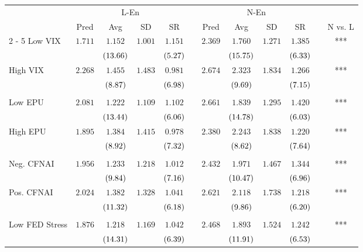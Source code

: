 \begin{tabular}{@{}lccccccccccc@{}}%
\toprule%
&\multicolumn{4}{c}{L{-}En}&&\multicolumn{4}{c}{N{-}En}&&\\%
\multicolumn{1}{c}{}&\multicolumn{1}{c}{Pred}&\multicolumn{1}{c}{Avg}&\multicolumn{1}{c}{SD}&\multicolumn{1}{c}{SR}&\multicolumn{1}{c}{}&\multicolumn{1}{c}{Pred}&\multicolumn{1}{c}{Avg}&\multicolumn{1}{c}{SD}&\multicolumn{1}{c}{SR}&\multicolumn{1}{c}{}&\multicolumn{1}{c}{N vs. L}\\%
\cmidrule{2%
-%
5}%
\cmidrule{7%
-%
10}%
\cmidrule{12%
-%
12}%
Low VIX&$1.711$&$1.152$&$1.001$&$1.151$&&$2.369$&$1.760$&$1.271$&$1.385$&&***\\%
&&$\footnotesize{(13.66)}$&&$\footnotesize{(5.27)}$&&&$\footnotesize{(15.75)}$&&$\footnotesize{(6.33)}$&&\\%
High VIX&$2.268$&$1.455$&$1.483$&$0.981$&&$2.674$&$2.323$&$1.834$&$1.266$&&***\\%
&&$\footnotesize{(8.87)}$&&$\footnotesize{(6.98)}$&&&$\footnotesize{(9.69)}$&&$\footnotesize{(7.15)}$&&\\%
\midrule%
&&&&&&&&&&&\\%
Low EPU&$2.081$&$1.222$&$1.109$&$1.102$&&$2.661$&$1.839$&$1.295$&$1.420$&&***\\%
&&$\footnotesize{(13.44)}$&&$\footnotesize{(6.06)}$&&&$\footnotesize{(14.78)}$&&$\footnotesize{(6.03)}$&&\\%
High EPU&$1.895$&$1.384$&$1.415$&$0.978$&&$2.380$&$2.243$&$1.838$&$1.220$&&***\\%
&&$\footnotesize{(8.92)}$&&$\footnotesize{(7.32)}$&&&$\footnotesize{(8.62)}$&&$\footnotesize{(7.64)}$&&\\%
\midrule%
&&&&&&&&&&&\\%
Neg. CFNAI&$1.956$&$1.233$&$1.218$&$1.012$&&$2.432$&$1.971$&$1.467$&$1.344$&&***\\%
&&$\footnotesize{(9.84)}$&&$\footnotesize{(7.16)}$&&&$\footnotesize{(10.47)}$&&$\footnotesize{(6.96)}$&&\\%
Pos. CFNAI&$2.024$&$1.382$&$1.328$&$1.041$&&$2.621$&$2.118$&$1.738$&$1.218$&&***\\%
&&$\footnotesize{(11.32)}$&&$\footnotesize{(6.18)}$&&&$\footnotesize{(9.86)}$&&$\footnotesize{(6.20)}$&&\\%
\midrule%
&&&&&&&&&&&\\%
Low FED Stress&$1.876$&$1.218$&$1.169$&$1.042$&&$2.468$&$1.893$&$1.524$&$1.242$&&***\\%
&&$\footnotesize{(14.31)}$&&$\footnotesize{(6.39)}$&&&$\footnotesize{(11.91)}$&&$\footnotesize{(6.53)}$&&\\%

\end{tabular}
